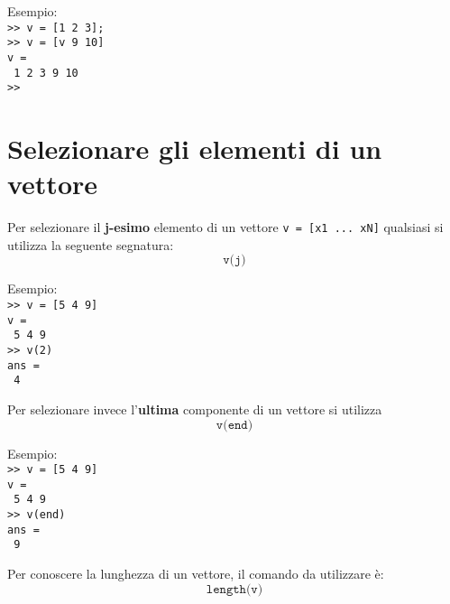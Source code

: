 \documentclass[12pt,a4paper,oneside]{book}
\begin{document}
Esempio: \\
\texttt{>> v = [1 2 3];} \\
\texttt{>> v = [v 9 10]} \\
\texttt{v = } \\
\texttt{\hspace{0.5cm} 1 \hspace{0.5cm} 2 \hspace{0.5cm} 3 \hspace{0.5cm} 9 \hspace{0.5cm} 10} \\
\texttt{>>}

\newpage

\section{Selezionare gli elementi di un vettore}
Per selezionare il \textbf{j-esimo} elemento di un vettore \texttt{v = [x1 ... xN]} qualsiasi si utilizza la seguente segnatura:
$$ \texttt{v(j)} $$

Esempio: \\
\texttt{>> v = [5 4 9]} \\
\texttt{v = } \\
\texttt{\hspace{0.5cm} 5 \hspace{0.5cm} 4 \hspace{0.5cm} 9} \\
\texttt{>> v(2)} \\
\texttt{ans = } \\
\texttt{\hspace{0.5cm} 4} \break

Per selezionare invece l'\textbf{ultima} componente di un vettore si utilizza
$$ \texttt{v(end)} $$

Esempio: \\
\texttt{>> v = [5 4 9]} \\
\texttt{v = } \\
\texttt{\hspace{0.5cm} 5 \hspace{0.5cm} 4 \hspace{0.5cm} 9} \\
\texttt{>> v(end)} \\
\texttt{ans = } \\
\texttt{\hspace{0.5cm} 9} \break

Per conoscere la lunghezza di un vettore, il comando da utilizzare è:
$$\texttt{length(v)} $$
\end{document}

